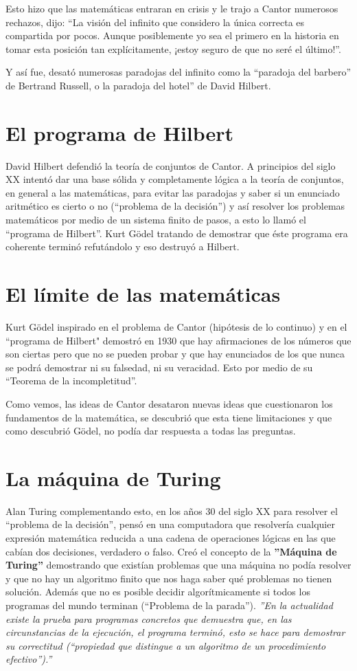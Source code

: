 ﻿\documentclass[journal,10pt,spanish]{IEEEtran}
\begin{document}
Esto hizo que las matemáticas entraran en crisis y le trajo a Cantor numerosos rechazos, dijo:
“La visión del infinito que considero la única correcta es compartida por pocos. Aunque posiblemente yo sea el primero en la historia en tomar esta posición tan explícitamente, ¡estoy seguro de que no seré el último!”. \cite{sitio4}

Y así fue, desató numerosas paradojas del infinito como la “paradoja del barbero” de Bertrand Russell, o la paradoja del hotel” de David Hilbert.

\section{El programa de Hilbert}

David Hilbert defendió la teoría de conjuntos de Cantor.  A principios del siglo XX intentó dar una base sólida y completamente lógica a la teoría de conjuntos, en general a las matemáticas, para evitar las paradojas y saber si un enunciado aritmético es cierto o no (“problema de la decisión”) y así resolver los problemas matemáticos por medio de un sistema finito de pasos, a esto lo llamó el “programa de Hilbert”. Kurt Gödel tratando de demostrar que éste programa era coherente terminó refutándolo y eso destruyó a Hilbert. \cite{sitio5}

\section{ El límite de las matemáticas}

Kurt Gödel inspirado en el problema de Cantor  (hipótesis de lo continuo) y en el “programa de Hilbert" demostró en 1930 que hay afirmaciones de los números que son ciertas pero que no se pueden probar  y que hay enunciados de los que nunca se podrá demostrar ni su falsedad, ni su veracidad. Esto por medio de su “Teorema de la incompletitud”. \cite{sitio6}

Como vemos, las ideas de Cantor desataron nuevas ideas que cuestionaron los fundamentos de la matemática, se descubrió que esta tiene limitaciones y que como descubrió  Gödel, no podía dar respuesta a todas las preguntas.

\section{ La máquina de Turing}
Alan Turing complementando esto, en los años 30 del siglo XX para resolver el “problema de la decisión”, pensó en una computadora que resolvería cualquier expresión matemática reducida a una cadena de operaciones lógicas en las que cabían dos decisiones, verdadero o falso. Creó el concepto de la \textbf{''Máquina de Turing''} demostrando que existían problemas que una máquina no podía resolver y  que no hay un algoritmo finito que nos haga saber qué problemas no tienen solución. Además que no es posible decidir algorítmicamente si todos los programas del mundo terminan (“Problema de la parada”).  \textsl{''En la actualidad existe la prueba para programas concretos que demuestra que, en las circunstancias de la ejecución, el programa terminó, esto se hace para demostrar su correctitud (“propiedad que distingue a un algoritmo de un procedimiento efectivo”).''} \cite{sitio8}
\end{document}
